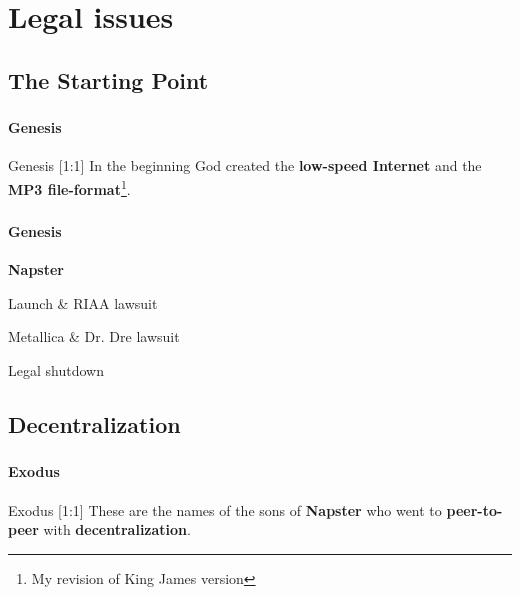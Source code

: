 \section{Legal issues}

  \begin{frame}
  \end{frame}

  \subsection{The Starting Point}
    \begin{frame}
      \frametitle{\subsecname}
      \framesubtitle{Genesis}

      \begin{block}{Genesis [1:1]}
        In the beginning God created the \textbf{low-speed Internet}
        and the \textbf{\textsc{MP3} file-format}\footnote{My revision
          of King James version}. 
      \end{block}
    \end{frame}

    \begin{frame}
      \frametitle{\subsecname}
      \framesubtitle{Genesis}

      {\large\bf Napster}
      \begin{description}[XXXX]
        \item[1999] Launch \& RIAA lawsuit
        \item[2000] Metallica \& Dr. Dre lawsuit
        \item[2001] Legal shutdown
      \end{description}
    \end{frame}
    
  \subsection{Decentralization}
    \begin{frame}
      \frametitle{\subsecname}
      \framesubtitle{Exodus}

     \begin{block}{Exodus [1:1]}
        These are the names of the sons of \textbf{Napster} who went
        to \textbf{peer-to-peer} with \textbf{decentralization}.
      \end{block}
    \end{frame}


